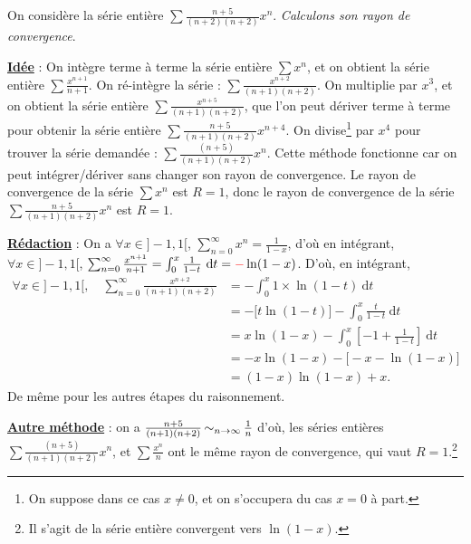 \begin{exo}
	On considère la série entière $\sum \frac{n + 5}{(n + 2)(n+2)} x^n$.
	\textsl{Calculons son rayon de convergence}.

	\ul{\textbf{Idée}} :
	On intègre terme à terme la série entière $\sum x^n$, et on obtient la série entière $\sum \frac{x^{n+1}}{n+1}$. On ré-intègre la série : $\sum \frac{x^{n+2}}{(n+1)(n+2)}$.
	On multiplie par $x^3$, et on obtient la série entière $\sum \frac{x^{n+5}}{(n+1)(n+2)}$, que l'on peut dériver terme à terme pour obtenir la série entière $\sum \frac{n+5}{(n+1)(n+2)} x^{n+4}$. On divise\footnote{On suppose dans ce cas $x \neq 0$, et on s'occupera du cas $x = 0$\/ à part.} par $x^4$\/ pour trouver la série demandée : $\sum \frac{(n+5)}{(n+1)(n+2)} x^n$.
	Cette méthode fonctionne car on peut intégrer/dériver sans changer son rayon de convergence.
	Le rayon de convergence de la série $\sum x^n$\/ est $R = 1$, donc le rayon de convergence de la série $\sum \frac{n+5}{(n+1)(n+2)} x^n$\/ est $R = 1$.

	\ul{\textbf{Rédaction}} :
	On a $\forall x \in {]-1,1[}$, $\sum_{n=0}^\infty x^n = \frac{1}{1-x}$, d'où en intégrant, $\forall x \in {]-1,1[}$, $\sum_{n=0}^\infty \frac{x^{n+1}}{n+1}= \int_{0}^{x} \frac{1}{1-t}~\mathrm{d}t = \mathbin{{\color{red}-}} \ln(1-x)$. D'où, en intégrant,
	\begin{align*}
		\forall x \in {]-1,1[},\quad \sum_{n=0}^\infty \frac{x^{n+2}}{(n+1)(n+2)} &= - \int_{0}^{x} 1 \times \ln(1-t)~\mathrm{d}t\\
		&= -\big[t \ln(1-t)\big] - \int_{0}^{x} \frac{t}{1-t}~\mathrm{d}t\\
		&= x \ln(1-x) - \int_{0}^{x} \left[-1 + \frac{1}{1-t}\right]~\mathrm{d}t \\
		&= -x\ln(1-x) - \big[-x -\ln(1-x)\big] \\
		&= (1-x) \ln(1-x) + x.
	\end{align*}
	De même pour les autres étapes du raisonnement.

	\ul{\textbf{Autre méthode}} : on a $\frac{n+5}{(n+1)(n+2)} \operatorname*{\sim}_{n\to \infty} \frac{1}{n}$\/ d'où, les séries entières $\sum \frac{(n+5)}{(n+1)(n+2)} x^n$, et $\sum \frac{x^n}{n}$\/ ont le même rayon de convergence, qui vaut $R = 1$.\footnote{Il s'agit de la série entière convergent vers $\ln(1-x)$.}
\end{exo}

